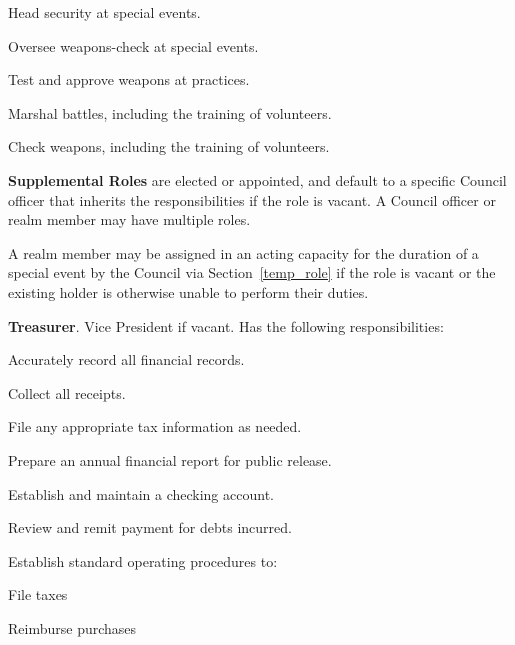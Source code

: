 \documentclass[12pt]{article}
\begin{document}
\begin{level}
\begin{level}
\begin{level}
            \item Head security at special events.
            \item Oversee weapons-check at special events.
            \item Test and approve weapons at practices.
            \item {}
            \begin{level}
                \item Marshal battles, including the training of volunteers.
                \item Check weapons, including the training of volunteers.
            \end{level}
        \end{level}
\end{level}
\item \textbf{Supplemental Roles} are elected or appointed, and default to a specific Council officer that inherits the responsibilities if the role is vacant. A Council officer or realm member may have multiple roles.\label{supplemental_roles}
\begin{level}
    \item A realm member may be assigned in an acting capacity for the duration of a special event by the Council via Section~\ref{temp_role} if the role is vacant or the existing holder is otherwise unable to perform their duties.
    \item \textbf{Treasurer}. Vice President if vacant. Has the following responsibilities:
    \begin{level}
        \item Accurately record all financial records.
        \item Collect all receipts.
        \item File any appropriate tax information as needed.
        \item Prepare an annual financial report for public release.
        \item Establish and maintain a checking account.
        \item Review and remit payment for debts incurred.
        \item Establish standard operating procedures to:
        \begin{level}
            \item File taxes
            \item Reimburse purchases
        \end{level}

\end{level}
\end{level}
\end{level}
\end{document}
